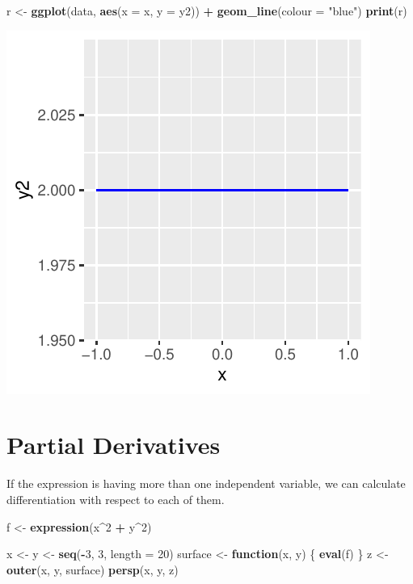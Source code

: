\documentclass[
]{book}
\newenvironment{Shaded}{\begin{snugshade}}{\end{snugshade}}
\newcommand{\AttributeTok}[1]{\textcolor[rgb]{0.13,0.29,0.53}{#1}}
\newcommand{\ControlFlowTok}[1]{\textcolor[rgb]{0.13,0.29,0.53}{\textbf{#1}}}
\newcommand{\DecValTok}[1]{\textcolor[rgb]{0.00,0.00,0.81}{#1}}
\newcommand{\FunctionTok}[1]{\textcolor[rgb]{0.13,0.29,0.53}{\textbf{#1}}}
\newcommand{\NormalTok}[1]{#1}
\newcommand{\OtherTok}[1]{\textcolor[rgb]{0.56,0.35,0.01}{#1}}
\newcommand{\SpecialCharTok}[1]{\textcolor[rgb]{0.81,0.36,0.00}{\textbf{#1}}}
\newcommand{\StringTok}[1]{\textcolor[rgb]{0.31,0.60,0.02}{#1}}
\begin{document}
\begin{Shaded}
\begin{Highlighting}[]
\NormalTok{r }\OtherTok{\textless{}{-}} \FunctionTok{ggplot}\NormalTok{(data, }\FunctionTok{aes}\NormalTok{(}\AttributeTok{x =}\NormalTok{ x, }\AttributeTok{y =}\NormalTok{ y2)) }\SpecialCharTok{+}
  \FunctionTok{geom\_line}\NormalTok{(}\AttributeTok{colour =} \StringTok{"blue"}\NormalTok{)}
\FunctionTok{print}\NormalTok{(r)}
\end{Highlighting}
\end{Shaded}

\includegraphics{bookdown-demo_files/figure-latex/unnamed-chunk-10-3.pdf}

\hypertarget{partial-derivatives}{%
\section{Partial Derivatives}\label{partial-derivatives}}

If the expression is having more than one independent variable, we can calculate differentiation with respect to each of them.

\begin{Shaded}
\begin{Highlighting}[]
\NormalTok{f }\OtherTok{\textless{}{-}} \FunctionTok{expression}\NormalTok{(x}\SpecialCharTok{\^{}}\DecValTok{2} \SpecialCharTok{+}\NormalTok{ y}\SpecialCharTok{\^{}}\DecValTok{2}\NormalTok{)}

\NormalTok{x }\OtherTok{\textless{}{-}}\NormalTok{ y }\OtherTok{\textless{}{-}} \FunctionTok{seq}\NormalTok{(}\SpecialCharTok{{-}}\DecValTok{3}\NormalTok{, }\DecValTok{3}\NormalTok{, }\AttributeTok{length =} \DecValTok{20}\NormalTok{)}
\NormalTok{surface }\OtherTok{\textless{}{-}} \ControlFlowTok{function}\NormalTok{(x, y) \{}
  \FunctionTok{eval}\NormalTok{(f)}
\NormalTok{\}}
\NormalTok{z }\OtherTok{\textless{}{-}} \FunctionTok{outer}\NormalTok{(x, y, surface)}
\FunctionTok{persp}\NormalTok{(x, y, z)}
\end{Highlighting}
\end{Shaded}
\end{document}
